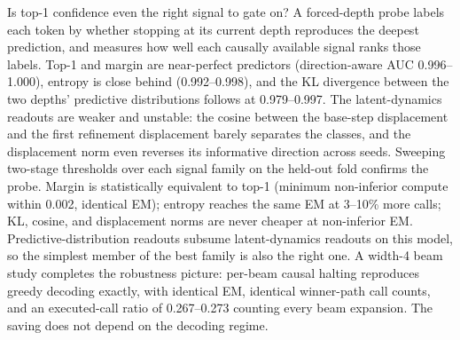 ﻿\documentclass[11pt]{article}
\begin{document}
Is top-1 confidence even the right signal to gate on? A forced-depth probe labels each token by whether stopping at its current depth reproduces the deepest prediction, and measures how well each causally available signal ranks those labels. Top-1 and margin are near-perfect predictors (direction-aware AUC 0.996--1.000), entropy is close behind (0.992--0.998), and the KL divergence between the two depths' predictive distributions follows at 0.979--0.997. The latent-dynamics readouts are weaker and unstable: the cosine between the base-step displacement and the first refinement displacement barely separates the classes, and the displacement norm even reverses its informative direction across seeds. Sweeping two-stage thresholds over each signal family on the held-out fold confirms the probe. Margin is statistically equivalent to top-1 (minimum non-inferior compute within 0.002, identical EM); entropy reaches the same EM at 3--10\% more calls; KL, cosine, and displacement norms are never cheaper at non-inferior EM. Predictive-distribution readouts subsume latent-dynamics readouts on this model, so the simplest member of the best family is also the right one. A width-4 beam study completes the robustness picture: per-beam causal halting reproduces greedy decoding exactly, with identical EM, identical winner-path call counts, and an executed-call ratio of 0.267--0.273 counting every beam expansion. The saving does not depend on the decoding regime.

\begin{table}[t]
\centering
\footnotesize
\setlength{\tabcolsep}{2.5pt}
\caption{\textbf{The threshold already sits on the accuracy--compute frontier.} For each seed we contrast the preregistered threshold with the cheapest policy the equal-budget optimizers found. The searched policies buy at most 2.1\% more saving than the threshold and, on seeds 0--1, do not pass the non-inferiority bound that the threshold passes. NI denotes the preregistered rule LCB$_{95\%}(\Delta\mathrm{EM}) \geq -0.5$pp; extra saving is the compute the searched policy removes beyond the threshold, relative to the threshold's own saving. Full policy list in Table~\ref{tab:halting}.}
\label{tab:frontier}
\end{table}
\end{document}
